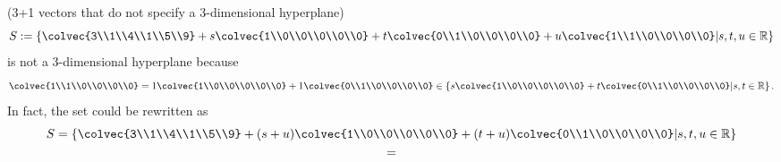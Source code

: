 \begin{example}{(3+1 vectors that do not specify a  3-dimensional hyperplane)}
\[S:=\left\{ \colvec{3\\1\\4\\1\\5\\9} + s\colvec{1\\0\\0\\0\\0\\0} + t\colvec{0\\1\\0\\0\\0\\0} +u \colvec{1\\1\\0\\0\\0\\0}\middle\arrowvert s, t,u \in \mathbb{R} \right\}\] 
is not a 3-dimensional hyperplane because 
\[\colvec{1\\1\\0\\0\\0\\0}=1\colvec{1\\0\\0\\0\\0\\0} + 1\colvec{0\\1\\0\\0\\0\\0} \in  \left\{     s\colvec{1\\0\\0\\0\\0\\0} + t\colvec{0\\1\\0\\0\\0\\0}  \middle\arrowvert  s,t \in \mathbb{R} \right\}.\]
In fact, the set could be rewritten as 
\begin{gather*}S=\left\{ \colvec{3\\1\\4\\1\\5\\9} + (s+u)\colvec{1\\0\\0\\0\\0\\0} + (t+u)\colvec{0\\1\\0\\0\\0\\0} \middle\arrowvert s, t,u \in \mathbb{R} \right\}\\=

\end{gather*}
\end{example}
